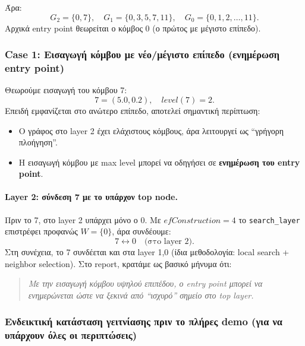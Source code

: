 \documentclass[12pt,a4paper]{article}
\begin{document}
Άρα:
\[
G_2=\{0,7\},\quad
G_1=\{0,3,5,7,11\},\quad
G_0=\{0,1,2,\dots,11\}.
\]
Αρχικά entry point θεωρείται ο κόμβος 0 (ο πρώτος με μέγιστο επίπεδο).

\subsubsection{Case 1: Εισαγωγή κόμβου με νέο/μέγιστο επίπεδο (ενημέρωση entry point)}
\label{subsec:case_maxlevel}

Θεωρούμε εισαγωγή του κόμβου 7:
\[
7=(5.0,0.2),\quad level(7)=2.
\]
Επειδή εμφανίζεται στο ανώτερο επίπεδο, αποτελεί σημαντική περίπτωση:
\begin{itemize}
    \item Ο γράφος στο layer 2 έχει ελάχιστους κόμβους, άρα λειτουργεί ως ``γρήγορη πλοήγηση''.
    \item Η εισαγωγή κόμβου με max level μπορεί να οδηγήσει σε \textbf{ενημέρωση του entry point}.
\end{itemize}

\paragraph{Layer 2: σύνδεση 7 με το υπάρχον top node.}
Πριν το 7, στο layer 2 υπάρχει μόνο ο 0. Με $efConstruction=4$ το \texttt{search\_layer} επιστρέφει προφανώς
$W=\{0\}$, άρα συνδέουμε:
\[
7 \leftrightarrow 0 \quad \text{(στο layer 2)}.
\]
Στη συνέχεια, το 7 συνδέεται και στα layer 1,0 (ίδια μεθοδολογία: local search + neighbor selection).
Στο report, κρατάμε ως βασικό μήνυμα ότι:
\begin{quote}
\textit{Με την εισαγωγή κόμβου υψηλού επιπέδου, ο entry point μπορεί να ενημερώνεται ώστε να ξεκινά από ``ισχυρό'' σημείο στο top layer.}
\end{quote}

\subsubsection{Ενδεικτική κατάσταση γειτνίασης πριν το πλήρες demo (για να υπάρχουν όλες οι περιπτώσεις)}
\label{subsec:assumed_state}
\end{document}
